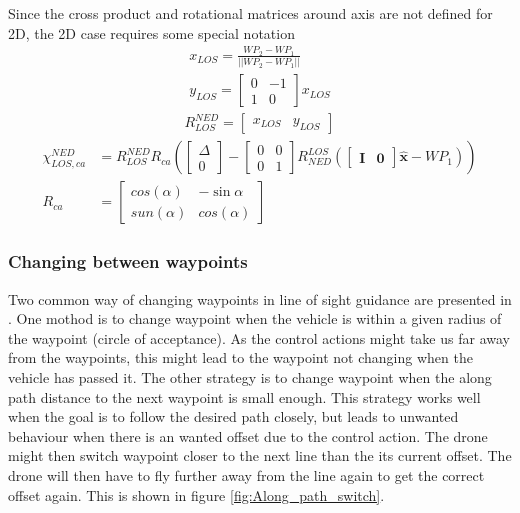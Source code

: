 Since the cross product and rotational matrices around axis are not defined for 2D, the 2D case requires some special notation
\begin{align}
    x_{LOS} = \frac{WP_2 - WP_1}{||WP_2 - WP_1||} \\
    y_{LOS} = \begin{bmatrix}0 & -1\\ 1 & 0 \end{bmatrix} x_{LOS}
\end{align}
\begin{align}
    R^{NED}_{LOS} = \begin{bmatrix} x_{LOS} & y_{LOS} \end{bmatrix}
\end{align}
\begin{align}
    \chi^{NED}_{LOS,ca} & = R^{NED}_{LOS}  R_{ca} \left(  \begin{bmatrix}\Delta \\ 0 \end{bmatrix} - \begin{bmatrix} 0 & 0  \\ 0 & 1  \end{bmatrix} R^{LOS}_{NED} (\begin{bmatrix} \mathbf{I} & \mathbf{0} \end{bmatrix} \hat{\textbf{x}} - WP_1) \right)\\
    R_{ca} & = \begin{bmatrix}cos(\alpha) & -\sin{\alpha}\\ sun(\alpha) & cos(\alpha) \end{bmatrix}
\end{align}

\subsubsection*{Changing between waypoints} \label{wp_change}



Two common way of changing waypoints in line of sight guidance are presented in \cite{Fossen2011}. One mothod is to change waypoint when the vehicle is within a given radius of the waypoint (circle of acceptance). As the control actions might take us far away from the waypoints, this might lead to the waypoint not changing when the vehicle has passed it. The other strategy is to change waypoint when the along path distance to the next waypoint is small enough. This strategy works well when the goal is to follow the desired path closely, but leads to unwanted behaviour when there is an wanted offset due to the control action. The drone might then switch waypoint closer to the next line than the its current offset. The drone will then have to fly further away from the line again to get the correct offset again. This is shown in figure \ref{fig:Along_path_switch}.


